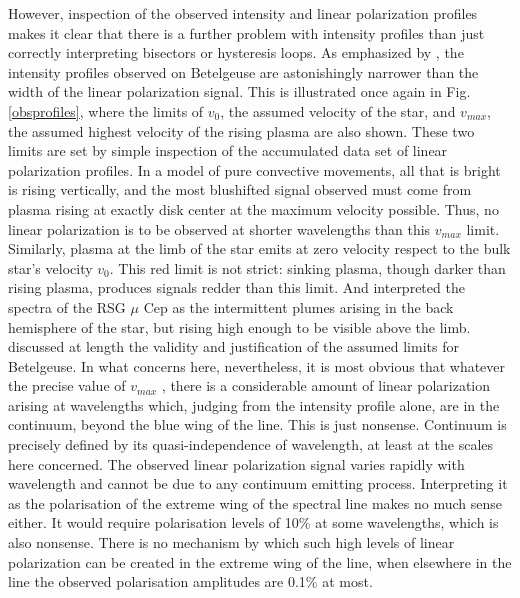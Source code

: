 \documentclass{/Users/art2/TeX/aanda/aa}
\begin{document}
However, inspection of the observed intensity and linear polarization profiles makes it clear that there is a further problem with intensity profiles 
than just correctly interpreting bisectors or hysteresis loops. As emphasized by \cite{XXX}, the intensity profiles observed on Betelgeuse are astonishingly 
narrower than the width of the linear polarization signal. This is illustrated once again in Fig. \ref{obsprofiles}, where the limits of $v_0$, the assumed velocity 
of the star, and $v_{max}$, the assumed highest velocity of the rising plasma are also shown. These two limits are set by simple inspection of the
accumulated data set of linear polarization profiles. In a model of pure convective movements, all that is bright is rising vertically, and the most 
blushifted signal observed must come from plasma rising at exactly disk center at the maximum velocity possible. Thus, no linear polarization is 
to be observed at shorter wavelengths than this $v_{max}$ limit. Similarly, plasma at the limb of the star emits at zero velocity respect to the 
bulk star's velocity $v_0$. This red limit is not strict: sinking plasma, though darker than rising plasma, produces signals redder than this limit. And 
\cite{muCep} interpreted the spectra of the RSG $\mu $ Cep as the intermittent plumes arising in the back hemisphere of the star, but rising high enough to 
be visible above the limb. \cite{lopez_ariste_three-dimensional_2022} discussed at length the validity and justification of the assumed limits for Betelgeuse.  In what concerns here, nevertheless, 
it is most obvious that whatever the precise value of $v_{max}$ , there is a considerable amount of linear polarization arising at wavelengths which, judging from the intensity profile alone, 
are in the continuum, beyond the blue 
wing of the line. This is just nonsense. Continuum is precisely defined by its quasi-independence of wavelength, at least at the 
scales here concerned. The observed linear polarization signal varies rapidly with wavelength and cannot be due to any continuum emitting process. Interpreting it as the polarisation of the extreme 
wing of the spectral line makes no much sense either. It would require polarisation levels of 10\% at some wavelengths, which is also nonsense. There is no 
mechanism by which such high levels of linear polarization can be created in the extreme wing of the line, when elsewhere in the line the observed polarisation amplitudes 
are  0.1\%  at most. 
\end{document}
